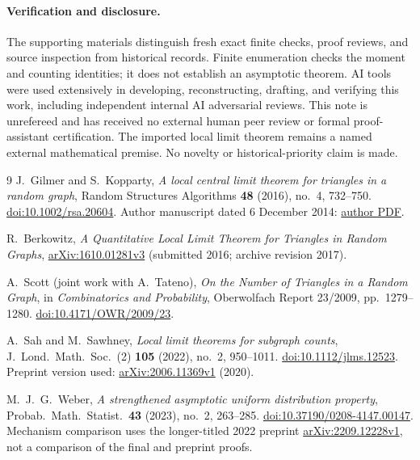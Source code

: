 \documentclass[11pt]{article}
\begin{document}
\paragraph{Verification and disclosure.}
The supporting materials distinguish fresh exact finite checks, proof
reviews, and source inspection from historical records. Finite enumeration
checks the moment and counting identities; it does not establish an
asymptotic theorem. AI tools were used extensively in developing,
reconstructing, drafting, and verifying this work, including independent
internal AI adversarial reviews. This note is unrefereed and has received
no external human peer review or formal proof-assistant certification.
The imported local limit theorem remains a named external mathematical
premise. No novelty or historical-priority claim is made.

\begin{thebibliography}{9}
J.~Gilmer and S.~Kopparty,
\emph{A local central limit theorem for triangles in a random graph},
Random Structures Algorithms \textbf{48} (2016), no.~4, 732--750.
\href{https://doi.org/10.1002/rsa.20604}{doi:10.1002/rsa.20604}.
Author manuscript dated 6 December 2014:
\href{https://sites.math.rutgers.edu/~sk1233/triangles.pdf}{author PDF}.

R.~Berkowitz,
\emph{A Quantitative Local Limit Theorem for Triangles in Random Graphs},
\href{https://arxiv.org/abs/1610.01281v3}{arXiv:1610.01281v3}
(submitted 2016; archive revision 2017).

A.~Scott (joint work with A.~Tateno),
\emph{On the Number of Triangles in a Random Graph},
in \emph{Combinatorics and Probability}, Oberwolfach Report 23/2009,
pp.~1279--1280.
\href{https://doi.org/10.4171/OWR/2009/23}{doi:10.4171/OWR/2009/23}.

A.~Sah and M.~Sawhney,
\emph{Local limit theorems for subgraph counts},
J.~Lond.\ Math.\ Soc.\ (2) \textbf{105} (2022), no.~2, 950--1011.
\href{https://doi.org/10.1112/jlms.12523}{doi:10.1112/jlms.12523}.
Preprint version used:
\href{https://arxiv.org/abs/2006.11369v1}{arXiv:2006.11369v1} (2020).

M.~J.~G.~Weber,
\emph{A strengthened asymptotic uniform distribution property},
Probab.\ Math.\ Statist.\ \textbf{43} (2023), no.~2, 263--285.
\href{https://doi.org/10.37190/0208-4147.00147}{doi:10.37190/0208-4147.00147}.
Mechanism comparison uses the longer-titled 2022 preprint
\href{https://arxiv.org/abs/2209.12228v1}{arXiv:2209.12228v1},
not a comparison of the final and preprint proofs.
\end{thebibliography}
\end{document}
